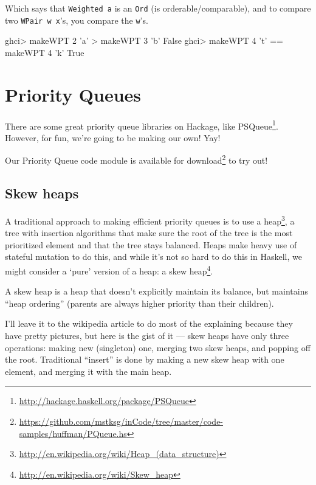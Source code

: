 \documentclass[]{article}
\newenvironment{Shaded}{\begin{snugshade}}{\end{snugshade}}
\newcommand{\CharTok}[1]{\textcolor[rgb]{0.31,0.60,0.02}{#1}}
\newcommand{\DataTypeTok}[1]{\textcolor[rgb]{0.13,0.29,0.53}{#1}}
\newcommand{\DecValTok}[1]{\textcolor[rgb]{0.00,0.00,0.81}{#1}}
\newcommand{\FunctionTok}[1]{\textcolor[rgb]{0.00,0.00,0.00}{#1}}
\newcommand{\NormalTok}[1]{#1}
\renewcommand{\href}[2]{#2\footnote{\url{#1}}}
\begin{document}
Which says that \texttt{Weighted\ a} is an \texttt{Ord} (is
orderable/comparable), and to compare two \texttt{WPair\ w\ x}'s, you compare
the \texttt{w}'s.

\begin{Shaded}
\begin{Highlighting}[]
\NormalTok{ghci}\FunctionTok{>}\NormalTok{ makeWPT }\DecValTok{2} \CharTok{'a'} \FunctionTok{>}\NormalTok{ makeWPT }\DecValTok{3} \CharTok{'b'}
\DataTypeTok{False}
\NormalTok{ghci}\FunctionTok{>}\NormalTok{ makeWPT }\DecValTok{4} \CharTok{'t'} \FunctionTok{==}\NormalTok{ makeWPT }\DecValTok{4} \CharTok{'k'}
\DataTypeTok{True}
\end{Highlighting}
\end{Shaded}

\hypertarget{priority-queues}{%
\section{Priority Queues}\label{priority-queues}}

There are some great priority queue libraries on Hackage, like
\href{http://hackage.haskell.org/package/PSQueue}{PSQueue}. However, for fun,
we're going to be making our own! Yay!

Our Priority Queue code module is
\href{https://github.com/mstksg/inCode/tree/master/code-samples/huffman/PQueue.hs}{available
for download} to try out!

\hypertarget{skew-heaps}{%
\subsection{Skew heaps}\label{skew-heaps}}

A traditional approach to making efficient priority queues is to use a
\href{http://en.wikipedia.org/wiki/Heap_(data_structure)}{heap}, a tree with
insertion algorithms that make sure the root of the tree is the most prioritized
element and that the tree stays balanced. Heaps make heavy use of stateful
mutation to do this, and while it's not so hard to do this in Haskell, we might
consider a `pure' version of a heap: a
\href{http://en.wikipedia.org/wiki/Skew_heap}{skew heap}.

A skew heap is a heap that doesn't explicitly maintain its balance, but
maintains ``heap ordering'' (parents are always higher priority than their
children).

I'll leave it to the wikipedia article to do most of the explaining because they
have pretty pictures, but here is the gist of it --- skew heaps have only three
operations: making new (singleton) one, merging two skew heaps, and popping off
the root. Traditional ``insert'' is done by making a new skew heap with one
element, and merging it with the main heap.
\end{document}
